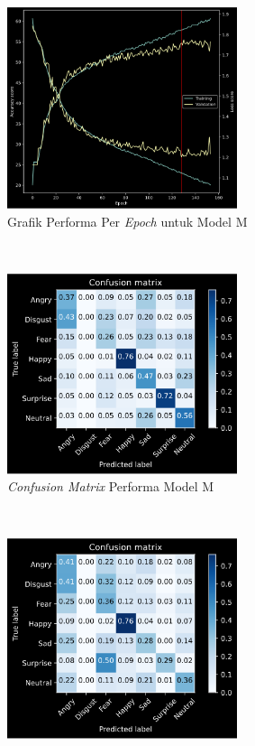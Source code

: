 \begin{figure}[!htb]
    \ContinuedFloat
    \centering
    \begin{subfigure}[t]{6.75cm}
        \includegraphics[width=6.75cm]{gambar/eksperimen4b2_grafik3.png}
        \caption{Grafik Performa Per \textit{Epoch} untuk Model M}
        \label{fig:grafikeksperimen4b23}
    \end{subfigure}
    ~~~
    \begin{subfigure}[t]{6.75cm}
        \includegraphics[width=6.75cm]{gambar/eksperimen4b2_matriks3.png}
        \caption{\textit{Confusion Matrix} Performa Model M}
        \label{fig:confusionmatrixeksperimen4b23}
    \end{subfigure}
    ~~~
    \begin{subfigure}[t]{6.75cm}
        \includegraphics[width=6.75cm]{gambar/eksperimen4b2_matriks4.png}

\end{subfigure}
\end{figure}
